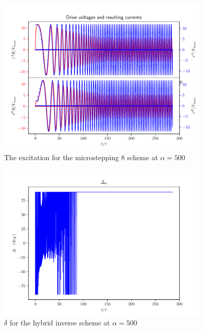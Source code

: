 \documentclass{article}
\begin{document}
\begin{figure}[h!]
  \centering
  \includegraphics[width=0.9\textwidth]{simfigs/fig3-2018-10-20T14-34-21-micro8-alpha-500.pdf}
  \captionsetup{justification=centering}
  \caption{The excitation for the microstepping 8 scheme at $\alpha=500$}
   \label{fig:exc-micro-alpha-500}
\end{figure}
\begin{figure}[h!]
  \centering
  \includegraphics[width=0.9\textwidth]{simfigs/fig5-2018-10-20T14-36-07-hybrid-accel-False-alpha-500.pdf}
  \captionsetup{justification=centering}
  \caption{$\delta$ for the hybrid inverse scheme at $\alpha=500$}
   \label{fig:delta-hybrid-alpha-500}
\end{figure}
\end{document}

